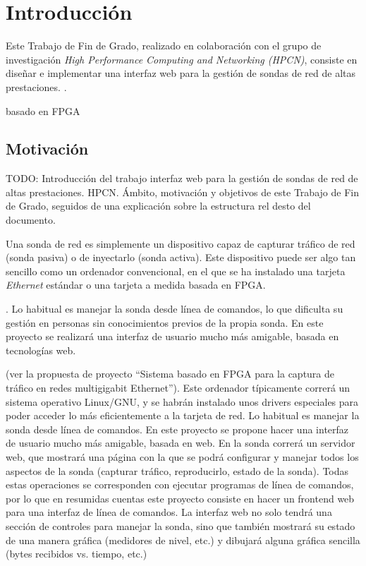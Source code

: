 \chapter{Introducción}

Este Trabajo de Fin de Grado, realizado en colaboración con el grupo de investigación \textit{High Performance Computing and Networking (HPCN)}, consiste en diseñar e implementar una interfaz web para la gestión de sondas de red de altas prestaciones.
.



basado en FPGA

\section{Motivación}

TODO: Introducción del trabajo
interfaz web para la gestión de sondas de red de altas prestaciones. HPCN. Ámbito, motivación y objetivos de este Trabajo de Fin de Grado, seguidos de una explicación sobre la estructura rel desto del documento.

Una sonda de red es simplemente un dispositivo capaz de capturar tráfico de red (sonda pasiva) o de inyectarlo (sonda activa). Este dispositivo puede ser algo tan sencillo como un ordenador convencional, en el que se ha instalado una tarjeta \textit{Ethernet} estándar o una tarjeta a medida basada en \gls{FPGA}. 

. Lo habitual es manejar la sonda desde línea de comandos, lo que dificulta su gestión en personas sin conocimientos previos de la propia sonda. En este proyecto se realizará una interfaz de usuario mucho más amigable, basada en tecnologías web. 


 (ver la propuesta de proyecto “Sistema basado en FPGA para la captura de tráfico en redes multigigabit Ethernet”). Este ordenador típicamente correrá un sistema operativo Linux/GNU, y se habrán instalado unos drivers especiales para poder acceder lo más eficientemente a la tarjeta de red. Lo habitual es manejar la sonda desde línea de comandos. En este proyecto se propone hacer una interfaz de usuario mucho más amigable, basada en web. En la sonda correrá un servidor web, que mostrará una página con la que se podrá configurar y manejar todos los aspectos de la sonda (capturar tráfico, reproducirlo, estado de la sonda). Todas estas operaciones se corresponden con ejecutar programas de línea de comandos, por lo que en resumidas cuentas este proyecto consiste en hacer un frontend web para una interfaz de línea de comandos. La interfaz web no solo tendrá una sección de controles para manejar la sonda, sino que también mostrará su estado de una manera gráfica (medidores de nivel, etc.) y dibujará alguna gráfica sencilla (bytes recibidos vs. tiempo, etc.)


